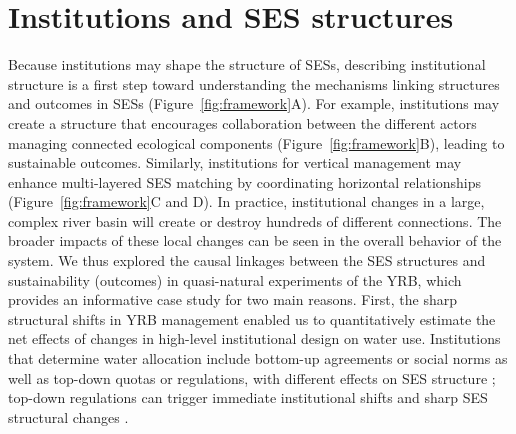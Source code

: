 \documentclass{article}
\begin{document}
\section{Institutions and SES structures}
Because institutions may shape the structure of SESs, describing institutional structure is a first step toward understanding the mechanisms linking structures and outcomes in SESs (Figure~\ref{fig:framework}A).
For example, institutions may create a structure that encourages collaboration between the different actors managing connected ecological components (Figure~\ref{fig:framework}B), leading to sustainable outcomes.
Similarly, institutions for vertical management may enhance multi-layered SES matching by coordinating horizontal relationships (Figure~\ref{fig:framework}C and D).
In practice, institutional changes in a large, complex river basin will create or destroy hundreds of different connections. The broader impacts of these local changes can be seen in the overall behavior of the system.
We thus explored the causal linkages between the SES structures and sustainability (outcomes) in quasi-natural experiments of the YRB, which provides an informative case study for two main reasons.
First, the sharp structural shifts in YRB management enabled us to quantitatively estimate the net effects of changes in high-level institutional design on water use. Institutions that determine water allocation include bottom-up agreements or social norms as well as top-down quotas or regulations, with different effects on SES structure \cite{wangAlignmentsocialecological2019,speedBasinwaterallocation2013}; top-down regulations can trigger immediate institutional shifts and sharp SES structural changes \cite{speedBasinwaterallocation2013,rolandUnderstandinginstitutionalchange2004}.
\end{document}
